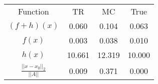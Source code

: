\begin{tabular}{| c |c |c |c |}
    \hline
    \rowcolor[gray]{0.9}
\multicolumn{4}{|c|}{Minima} \\ \hline Function & TR & MC & True \\
    \hline
  \rowcolor[gray]{0.7}
    $ (f + h)(x) $ & 0.060 & 0.104 & 0.063 \\
  \hline
  \rowcolor[gray]{0.8}
    $ f(x) $ & 0.003 & 0.038 & 0.010 \\
  \hline
  \rowcolor[gray]{0.7}
    $ h(x) $ & 10.661 & 12.319 & 10.000 \\
  \hline
  \rowcolor[gray]{0.8}
    $ \frac{||x - x_0||_2}{||A||} $ & 0.009 & 0.371 & 0.000 \\
  \hline
\end{tabular}
